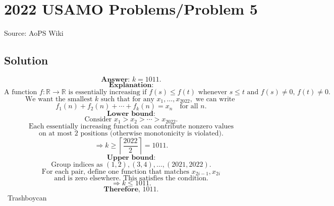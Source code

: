 \documentclass[12pt]{article}
\begin{document}
\section*{{2022 USAMO Problems/Problem 5}}
Source: AoPS Wiki

\subsection*{Solution}
\[\textbf{Answer: } k = 1011.\] \[\textbf{Explanation:}\] \[\text{A function } f:\mathbb{R}\to\mathbb{R} \text{ is essentially increasing if } f(s)\le f(t) \text{ whenever } s\le t \text{ and } f(s)\ne 0,\, f(t)\ne 0.\] \[\text{We want the smallest } k \text{ such that for any } x_1,\dots,x_{2022}, \text{ we can write }\] \[f_1(n)+f_2(n)+\cdots+f_k(n)=x_n \quad \text{for all } n.\] \[\textbf{Lower bound:}\] \[\text{Consider } x_1 > x_2 > \cdots > x_{2022}.\] \[\text{Each essentially increasing function can contribute nonzero values}\] \[\text{on at most 2 positions (otherwise monotonicity is violated).}\] \[\Rightarrow k \ge \left\lceil \frac{2022}{2} \right\rceil = 1011.\] \[\textbf{Upper bound:}\] \[\text{Group indices as } (1,2), (3,4), \dots, (2021,2022).\] \[\text{For each pair, define one function that matches } x_{2i-1}, x_{2i}\] \[\text{and is zero elsewhere. This satisfies the condition.}\] \[\Rightarrow k \le 1011.\] \[\textbf{Therefore, } \boxed{1011}.\] ~Trashboycan
\end{document}
